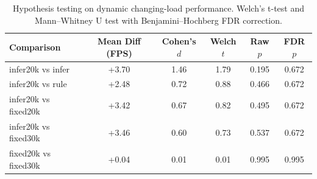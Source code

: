 \begin{table}[t]
\centering
\caption{Hypothesis testing on dynamic changing-load performance. Welch's t-test and Mann--Whitney U test with Benjamini--Hochberg FDR correction.}
\label{tab:statistical_tests}
\small
\begin{tabular}{lccccc}
\toprule
\textbf{Comparison} & \textbf{Mean Diff (FPS)} & \textbf{Cohen's $d$} & \textbf{Welch $t$} & \textbf{Raw $p$} & \textbf{FDR $p$} \\
\midrule
infer20k vs infer & +3.70 & 1.46 & 1.79 & 0.195 & 0.672 \\
infer20k vs rule & +2.48 & 0.72 & 0.88 & 0.466 & 0.672 \\
infer20k vs fixed20k & +3.42 & 0.67 & 0.82 & 0.495 & 0.672 \\
infer20k vs fixed30k & +3.46 & 0.60 & 0.73 & 0.537 & 0.672 \\
fixed20k vs fixed30k & +0.04 & 0.01 & 0.01 & 0.995 & 0.995 \\
\bottomrule
\end{tabular}
\end{table}